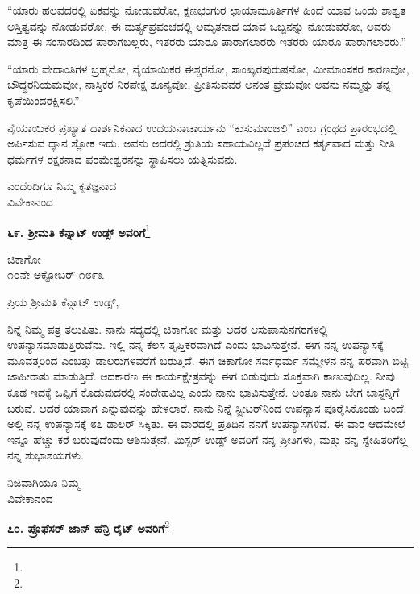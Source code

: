 “ಯಾರು ಹಲವದರಲ್ಲಿ ಏಕವನ್ನು ನೋಡುವರೋ, ಕ್ಷಣಭಂಗುರ ಛಾಯಾಮೂರ್ತಿ\break ಗಳ ಹಿಂದೆ ಯಾವ ಒಂದು ಶಾಶ್ವತ ಅಸ್ತಿತ್ವವನ್ನು ನೋಡುವರೋ, ಈ ಮರ್ತ್ಯಪ್ರಪಂಚದಲ್ಲಿ ಅಮೃತನಾದ ಯಾವ ಒಬ್ಬನನ್ನು ನೋಡುವರೋ, ಅವರು ಮಾತ್ರ ಈ ಸಂಸಾರದಿಂದ ಪಾರಾಗಬಲ್ಲರು, ಇತರರು ಯಾರೂ ಪಾರಾಗಲಾರರು\enginline{-} ಇತರರು ಯಾರೂ ಪಾರಾಗಲಾರರು.”

“ಯಾರು ವೇದಾಂತಿಗಳ ಬ್ರಹ್ಮನೋ, ನೈಯಾಯಿಕರ ಈಶ್ಚರನೋ, ಸಾಂಖ್ಯರ\break ಪುರುಷನೋ, ಮೀಮಾಂಸಕರ ಕಾರಣವೋ, ಬೌದ್ಧರನಿಯಮವೋ, ನಾಸ್ತಿಕರ ನಿರಪೇಕ್ಷ ಶೂನ್ಯವೋ, ಪ್ರೀತಿಸುವವರ ಅನಂತ ಪ್ರೇಮವೋ ಅವನು ನಮ್ಮನ್ನು ತನ್ನ ಕೃಪೆಯಿಂದ\break ರಕ್ಷಿಸಲಿ.”

ನೈಯಾಯಿಕರ ಪ್ರಖ್ಯಾತ ದಾರ್ಶನಿಕನಾದ ಉದಯನಾಚಾರ್ಯನು “ಕುಸುಮಾಂಜಲಿ” ಎಂಬ ಗ್ರಂಥದ ಪ್ರಾರಂಭದಲ್ಲಿ ಅರ್ಪಿಸುವ ಧ್ಯಾನ ಶ್ಲೋಕ ಇದು. ಅವನು ಅದರಲ್ಲಿ ಶ್ರುತಿಯ ಸಹಾಯವಿಲ್ಲದೆ ಪ್ರಪಂಚದ ಕರ್ತೃವಾದ ಮತ್ತು ನೀತಿ ಧರ್ಮಗಳ ರಕ್ಷಕನಾದ ಪರಮೇಶ್ವರನನ್ನು ಸ್ಥಾಪಿಸಲು ಯತ್ನಿಸುವನು.

{\flushright
ಎಂದೆಂದಿಗೂ ನಿಮ್ಮ ಕೃತಜ್ಞನಾದ\\ವಿವೇಕಾನಂದ\par}

\begin{center}
\textbf{೬೯. ಶ‍್ರೀಮತಿ ಕೆನ್ನಾಟ್ ಉಡ್ಸ್ ಅವರಿಗೆ}\footnote{}
\end{center}

\begin{flushright}
ಚಿಕಾಗೋ\\೧೦ನೇ ಅಕ್ಟೋಬರ್ ೧೮೯೩
\end{flushright}

\noindent
ಪ್ರಿಯ ಶ‍್ರೀಮತಿ ಕೆನ್ನಾಟ್ ಉಡ್ಸ್,

ನಿನ್ನೆ ನಿಮ್ಮ ಪತ್ರ ತಲುಪಿತು. ನಾನು ಸದ್ಯದಲ್ಲಿ ಚಿಕಾಗೋ ಮತ್ತು ಅದರ ಆಸುಪಾಸುನಗರಗಳಲ್ಲಿ ಉಪನ್ಯಾಸಮಾಡುತ್ತಿರುವೆನು. ಇಲ್ಲಿ ನನ್ನ ಕೆಲಸ ತೃಪ್ತಿಕರವಾಗಿದೆ ಎಂದು ಭಾವಿಸುತ್ತೇನೆ. ಈಗ ನನ್ನ ಉಪನ್ಯಾಸಕ್ಕೆ ಮೂವತ್ತರಿಂದ ಎಂಬತ್ತು ಡಾಲರುಗಳವರೆಗೆ ಬರುತ್ತಿದೆ. ಈಗ ಚಿಕಾಗೋ ಸರ್ವಧರ್ಮ ಸಮ್ಮೇಳನ ನನ್ನ ಪರವಾಗಿ ಬಿಟ್ಟಿ ಜಾಹೀರಾತು ಮಾಡುತ್ತಿದೆ. ಆದಕಾರಣ ಈ ಕಾರ್ಯಕ್ಷೇತ್ರವನ್ನು ಈಗ ಬಿಡುವುದು ಸೂಕ್ತವಾಗಿ ಕಾಣುವುದಿಲ್ಲ. ನೀವು ಕೂಡ ಇದಕ್ಕೆ ಒಪ್ಪಿಗೆ ಕೊಡುವುದರಲ್ಲಿ ಸಂದೇಹವಿಲ್ಲ ಎಂದು ನಾನು ಭಾವಿಸುತ್ತೇನೆ. ಅಂತೂ ನಾನು ಬೇಗ ಬಾಸ್ಟನ್ನಿಗೆ ಬರುವೆ. ಆದರೆ ಯಾವಾಗ ಎನ್ನುವುದನ್ನು ಹೇಳಲಾರೆ. ನಾನು ನಿನ್ನೆ ಸ್ಟ್ರೀಟರ್‌ನಿಂದ ಉಪನ್ಯಾಸ ಪೂರೈಸಿಕೊಂಡು ಬಂದೆ. ಅಲ್ಲಿ ನನ್ನ ಉಪನ್ಯಾಸಕ್ಕೆ ೮೭ ಡಾಲರ್ ಸಿಕ್ಕಿತು. ಈ ವಾರದಲ್ಲಿ ಪ್ರತಿದಿನ ನನಗೆ ಉಪನ್ಯಾಸಗಳಿವೆ. ಈ ವಾರ ಆದಮೇಲೆ ಇನ್ನೂ ಹೆಚ್ಚು ಕರೆ ಬರುವುದೆಂದು ಆಶಿಸುತ್ತೇನೆ. ಮಿಸ್ಟರ್ ಉಡ್ಸ್ ಅವರಿಗೆ ನನ್ನ ಪ್ರೀತಿಗಳು, ಮತ್ತು ನನ್ನ ಸ್ನೇಹಿತರಿಗೆಲ್ಲ ನನ್ನ ಶುಭಾಶಯಗಳು.
\vspace{-0.3cm}

{\flushright
ನಿಜವಾಗಿಯೂ ನಿಮ್ಮ\\ವಿವೇಕಾನಂದ\par}
\vspace{-0.5cm}

\begin{center}
\textbf{೭೦. ಪ್ರೊಫೆಸರ್ ಜಾನ್ ಹೆನ್ರಿ ರೈಟ್ ಅವರಿಗೆ}\footnote{}
\end{center}

